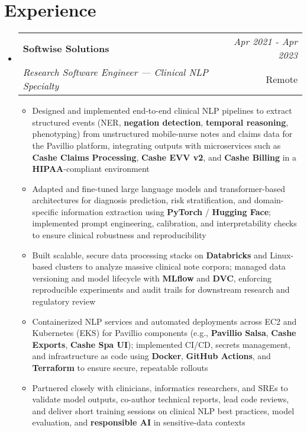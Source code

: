 \documentclass[a4paper,10pt]{article}
\makeatletter
\newcommand{\resumeSubheading}[4]{
\vspace{0.5mm}\item
    \begin{tabular*}{0.98\textwidth}[t]{l@{\extracolsep{\fill}}r}
        \textbf{#1} & \textit{\footnotesize{#4}} \\
        \textit{\footnotesize{#3}} &  \footnotesize{#2}\\
    \end{tabular*}
    \vspace{-2.4mm}
}
\newcommand{\resumeSubHeadingListStart}{\begin{itemize}[leftmargin=*,labelsep=1mm]}
\newcommand{\resumeItemListStart}{\begin{itemize}[leftmargin=*,labelsep=1mm,itemsep=0.5mm]}
\newcommand{\resumeSubHeadingListEnd}{\end{itemize}\vspace{2mm}}
\newcommand{\resumeItemListEnd}{\end{itemize}\vspace{-2mm}}
\makeatother
\begin{document}
\section{\textbf{Experience}}
\vspace{-0.4mm}
\resumeSubHeadingListStart
  \resumeSubheading
      {Softwise Solutions}{Remote}
      {Research Software Engineer — Clinical NLP Specialty}{Apr 2021 - Apr 2023}
      \resumeItemListStart
        \item Designed and implemented end-to-end clinical NLP pipelines to extract structured events (NER, \textbf{negation detection}, \textbf{temporal reasoning}, phenotyping) from unstructured mobile‑nurse notes and claims data for the Pavillio platform, integrating outputs with microservices such as \textbf{Cashe Claims Processing}, \textbf{Cashe EVV v2}, and \textbf{Cashe Billing} in a \textbf{HIPAA}-compliant environment
        \item Adapted and fine-tuned large language models and transformer-based architectures for diagnosis prediction, risk stratification, and domain-specific information extraction using \textbf{PyTorch} / \textbf{Hugging Face}; implemented prompt engineering, calibration, and interpretability checks to ensure clinical robustness and reproducibility
        \item Built scalable, secure data processing stacks on \textbf{Databricks} and Linux-based clusters to analyze massive clinical note corpora; managed data versioning and model lifecycle with \textbf{MLflow} and \textbf{DVC}, enforcing reproducible experiments and audit trails for downstream research and regulatory review
        \item Containerized NLP services and automated deployments across EC2 and Kubernetes (EKS) for Pavillio components (e.g., \textbf{Pavillio Salsa}, \textbf{Cashe Exports}, \textbf{Cashe Spa UI}); implemented CI/CD, secrets management, and infrastructure as code using \textbf{Docker}, \textbf{GitHub Actions}, and \textbf{Terraform} to ensure secure, repeatable rollouts
        \item Partnered closely with clinicians, informatics researchers, and SREs to validate model outputs, co-author technical reports, lead code reviews, and deliver short training sessions on clinical NLP best practices, model evaluation, and \textbf{responsible AI} in sensitive-data contexts
      \resumeItemListEnd 
\resumeSubHeadingListEnd

\vspace{-6mm}
\end{document}

